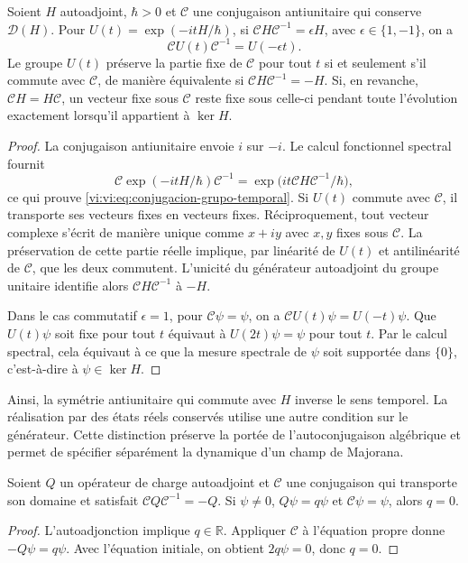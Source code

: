 \begin{proposition}
\label{vi:vi:prop:conjugacion-evolucion}
Soient $H$ autoadjoint, $\hbar>0$ et $\mathcal C$ une conjugaison
antiunitaire qui conserve $\mathcal D(H)$. Pour
$U(t)=\exp(-itH/\hbar)$, si
$\mathcal C H\mathcal C^{-1}=\epsilon H$, avec
$\epsilon\in\{1,-1\}$, on a
\begin{equation}
 \mathcal C U(t)\mathcal C^{-1}=U(-\epsilon t).
 \label{vi:vi:eq:conjugacion-grupo-temporal}
\end{equation}
Le groupe $U(t)$ préserve la partie fixe de $\mathcal C$ pour tout $t$
si et seulement s’il commute avec $\mathcal C$, de manière équivalente si
$\mathcal C H\mathcal C^{-1}=-H$.
Si, en revanche, $\mathcal C H=H\mathcal C$, un vecteur fixe sous
$\mathcal C$ reste fixe sous celle-ci pendant toute l’évolution
exactement lorsqu’il appartient à $\ker H$.
\end{proposition}
\begin{proof}
La conjugaison antiunitaire envoie $i$ sur $-i$. Le calcul fonctionnel
spectral fournit
\[
 \mathcal C\exp(-itH/\hbar)\mathcal C^{-1}
 =\exp\bigl(it\mathcal C H\mathcal C^{-1}/\hbar\bigr),
\]
ce qui prouve \eqref{vi:vi:eq:conjugacion-grupo-temporal}. Si $U(t)$ commute
avec $\mathcal C$, il transporte ses vecteurs fixes en vecteurs fixes.
Réciproquement, tout vecteur complexe s’écrit de manière unique comme
$x+iy$ avec $x,y$ fixes sous $\mathcal C$. La préservation de cette partie
réelle implique, par linéarité de $U(t)$ et antilinéarité de
$\mathcal C$, que les deux commutent. L’unicité du générateur
autoadjoint du groupe unitaire identifie alors
$\mathcal C H\mathcal C^{-1}$ à $-H$.

Dans le cas commutatif $\epsilon=1$, pour $\mathcal C\psi=\psi$,
on a $\mathcal C U(t)\psi=U(-t)\psi$. Que $U(t)\psi$ soit fixe
pour tout $t$ équivaut à $U(2t)\psi=\psi$ pour tout $t$. Par le
calcul spectral, cela équivaut à ce que la mesure spectrale de $\psi$
soit supportée dans $\{0\}$, c’est-à-dire à $\psi\in\ker H$.
\end{proof}

Ainsi, la symétrie antiunitaire qui commute avec $H$ inverse le sens
temporel. La réalisation par des états réels conservés utilise
une autre condition sur le générateur. Cette distinction préserve la portée
de l’autoconjugaison algébrique et permet de spécifier séparément la
dynamique d’un champ de Majorana.

\begin{proposition}
\label{vi:vi:prop:carga-real}
Soient $Q$ un opérateur de charge autoadjoint et $\mathcal C$ une
conjugaison qui transporte son domaine et satisfait
$\mathcal C Q\mathcal C^{-1}=-Q$. Si $\psi\ne0$,
$Q\psi=q\psi$ et $\mathcal C\psi=\psi$, alors $q=0$.
\end{proposition}
\begin{proof}
L’autoadjonction implique $q\in\mathbb R$. Appliquer $\mathcal C$
à l’équation propre donne $-Q\psi=q\psi$. Avec l’équation initiale,
on obtient $2q\psi=0$, donc $q=0$.
\end{proof}

